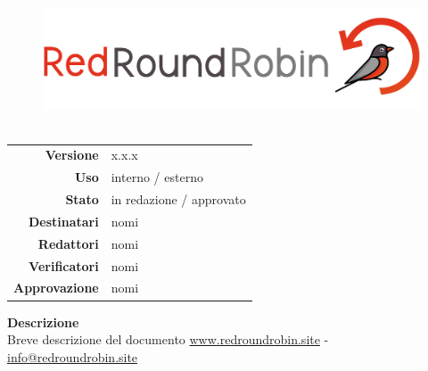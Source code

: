 
\begin{figure}[t!]
    \centering
    \includegraphics[height=11em]{res/images/logo.png}
\end{figure}

\maketitle 
\thispagestyle{empty}


\begin{table}[ht]
  \begin{center}
    \label{tab:Informazioni_Documento}
    \begin{tabular}{r|l}
    	\textbf{Versione} &  x.x.x \\
		\textbf{Uso} &  interno / esterno \\
        \textbf{Stato} & in redazione / approvato \\
		\textbf{Destinatari} &  nomi \\
		\textbf{Redattori} &  nomi \\
		\textbf{Verificatori} &  nomi\\
		\textbf{Approvazione} &  nomi \\
    \end{tabular}
  \end{center}
\end{table}


\begin{center}
	\vspace{1kem}
    \textbf{Descrizione}\\
    Breve descrizione del documento
    \hr
    \href{https://www.redroundrobin.site}{www.redroundrobin.site} - \href{mailto:info@redroundrobin.site}{info@redroundrobin.site}
\end{center}

